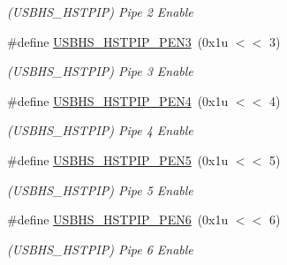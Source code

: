 \begin{DoxyCompactItemize}
\begin{DoxyCompactList}\small\item\em (U\+S\+B\+H\+S\+\_\+\+H\+S\+T\+P\+IP) Pipe 2 Enable \end{DoxyCompactList}\item 
\mbox{\label{group__SAME70__USBHS_ga96beaeeda6d25f9fa3be010d27498b15}} 
\#define \mbox{\hyperlink{group__SAME70__USBHS_ga96beaeeda6d25f9fa3be010d27498b15}{U\+S\+B\+H\+S\+\_\+\+H\+S\+T\+P\+I\+P\+\_\+\+P\+E\+N3}}~(0x1u $<$$<$ 3)
\begin{DoxyCompactList}\small\item\em (U\+S\+B\+H\+S\+\_\+\+H\+S\+T\+P\+IP) Pipe 3 Enable \end{DoxyCompactList}\item 
\mbox{\label{group__SAME70__USBHS_ga6888c4a72b7f8dd35a18e00c6a6daacf}} 
\#define \mbox{\hyperlink{group__SAME70__USBHS_ga6888c4a72b7f8dd35a18e00c6a6daacf}{U\+S\+B\+H\+S\+\_\+\+H\+S\+T\+P\+I\+P\+\_\+\+P\+E\+N4}}~(0x1u $<$$<$ 4)
\begin{DoxyCompactList}\small\item\em (U\+S\+B\+H\+S\+\_\+\+H\+S\+T\+P\+IP) Pipe 4 Enable \end{DoxyCompactList}\item 
\mbox{\label{group__SAME70__USBHS_gaab5c7f817eb4da9974b885d7b9de06dc}} 
\#define \mbox{\hyperlink{group__SAME70__USBHS_gaab5c7f817eb4da9974b885d7b9de06dc}{U\+S\+B\+H\+S\+\_\+\+H\+S\+T\+P\+I\+P\+\_\+\+P\+E\+N5}}~(0x1u $<$$<$ 5)
\begin{DoxyCompactList}\small\item\em (U\+S\+B\+H\+S\+\_\+\+H\+S\+T\+P\+IP) Pipe 5 Enable \end{DoxyCompactList}\item 
\mbox{\label{group__SAME70__USBHS_ga228d055418ac3fa91258155644bef5aa}} 
\#define \mbox{\hyperlink{group__SAME70__USBHS_ga228d055418ac3fa91258155644bef5aa}{U\+S\+B\+H\+S\+\_\+\+H\+S\+T\+P\+I\+P\+\_\+\+P\+E\+N6}}~(0x1u $<$$<$ 6)
\begin{DoxyCompactList}\small\item\em (U\+S\+B\+H\+S\+\_\+\+H\+S\+T\+P\+IP) Pipe 6 Enable \end{DoxyCompactList}\item 
\mbox{\label{group__SAME70__USBHS_ga25f985d289cb1cfd228ca1829157ce2a}} 

\end{DoxyCompactItemize}
